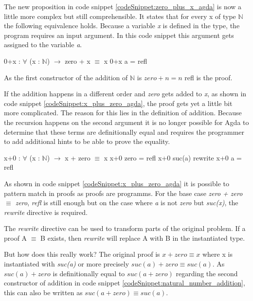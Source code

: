 The new proposition in code snippet \ref{codeSnippet:zero_plus_x_agda} is now a little more complex but still comprehensible. 
It states that for every x of type $\mathbb{N}$ the following equivalence holds. 
Because a variable \emph{x} is defined in the type, the program requires an input argument.
In this code snippet this argument gets assigned to the variable \emph{a}.

\begin{codesnippet}[mathescape=true, caption={Proof of addition to zero in Agda}, label={codeSnippet:zero_plus_x_agda}]
0+x : $\forall$ (x : $\mathbb{N}$) $\rightarrow$ zero + x $\equiv$ x
0+x a = refl
\end{codesnippet}

As the first constructor of the addition of $\mathbb{N}$ is $zero + n = n$ refl is the proof.

If the addition happens in a different order and \emph{zero} gets added to \emph{x}, as shown in code snippet \ref{codeSnippet:x_plus_zero_agda}, the proof gets yet a little bit more complicated. 
The reason for this lies in the definition of addition.
Because the recursion happens on the second argument it is no longer possible for Agda to determine that these terms are definitionally equal and requires the programmer to add additional hints to be able to prove the equality.

\begin{codesnippet}[mathescape=true, caption={Proof of addition of zero in Agda}, label={codeSnippet:x_plus_zero_agda}]
x+0 : $\forall$ (x : $\mathbb{N}$) $\rightarrow$ x + zero $\equiv$ x
x+0 zero = refl
x+0 suc(a) rewrite x+0 a = refl
\end{codesnippet}

As shown in code snippet \ref{codeSnippet:x_plus_zero_agda} it is possible to pattern match in proofs as proofs are programms.
For the base case \emph{zero + zero $\equiv$ zero}, \emph{refl} is still enough but on the case where \emph{a} is not \emph{zero} but \emph{suc(x)}, the \emph{rewrite} directive is required.

The \emph{rewrite} directive can be used to transform parts of the original problem. If a proof A $\equiv$ B exists, then \emph{rewrite} will replace A with B in the instantiated type.

But how does this really work?
The original proof is $x + zero \equiv x$ where x is instantiated with \emph{suc(a)} or more precisely $suc(a) + zero \equiv suc(a)$.
As $suc(a) + zero$ is definitionally equal to $suc(a + zero)$ regarding the second constructor of addition in code snippet \ref{codeSnippet:natural_number_addition}, this can also be written as $suc(a + zero) \equiv suc(a)$.


